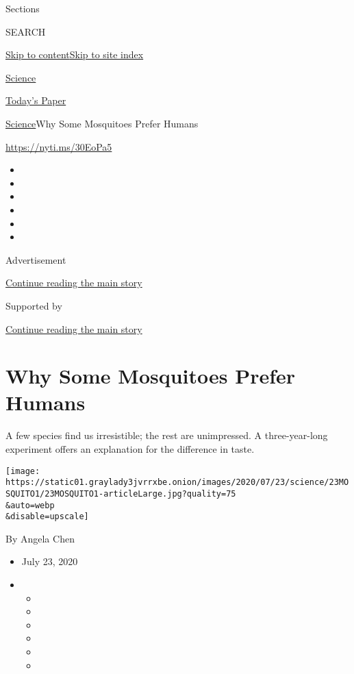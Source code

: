 Sections

SEARCH

\protect\hyperlink{site-content}{Skip to
content}\protect\hyperlink{site-index}{Skip to site index}

\href{https://www.nytimes3xbfgragh.onion/section/science}{Science}

\href{https://myaccount.nytimes3xbfgragh.onion/auth/login?response_type=cookie\&client_id=vi}{}

\href{https://www.nytimes3xbfgragh.onion/section/todayspaper}{Today's
Paper}

\href{/section/science}{Science}\textbar{}Why Some Mosquitoes Prefer
Humans

\url{https://nyti.ms/30EoPa5}

\begin{itemize}
\item
\item
\item
\item
\item
\item
\end{itemize}

Advertisement

\protect\hyperlink{after-top}{Continue reading the main story}

Supported by

\protect\hyperlink{after-sponsor}{Continue reading the main story}

\hypertarget{why-some-mosquitoes-prefer-humans}{%
\section{Why Some Mosquitoes Prefer
Humans}\label{why-some-mosquitoes-prefer-humans}}

A few species find us irresistible; the rest are unimpressed. A
three-year-long experiment offers an explanation for the difference in
taste.

\texttt{[image: https://static01.graylady3jvrrxbe.onion/images/2020/07/23/science/23MOSQUITO1/23MOSQUITO1-articleLarge.jpg?quality=75\\\&auto=webp\\\&disable=upscale]}

By Angela Chen

\begin{itemize}
\item
  July 23, 2020
\item
  \begin{itemize}
  \item
  \item
  \item
  \item
  \item
  \item
  \end{itemize}
\end{itemize}

